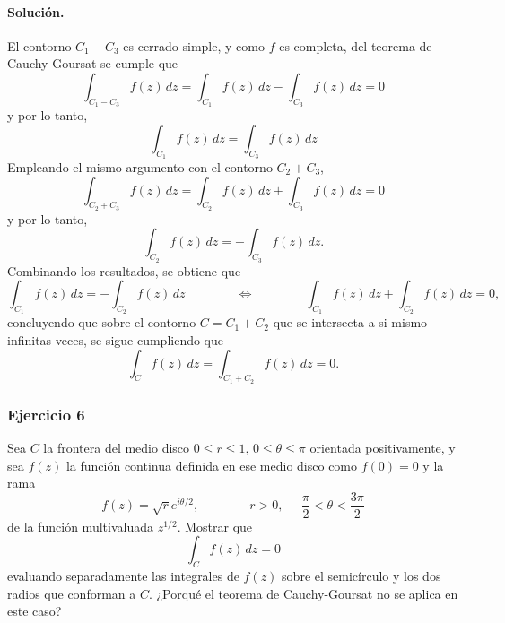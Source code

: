 \documentclass[a4paper]{report}
\begin{document}
\paragraph{Solución.} El contorno \(C_1-C_3\) es cerrado simple, y como \(f\) es completa, del teorema de Cauchy-Goursat se cumple que 
\[
 \int_{C_1-C_3}f(z)\,dz=\int_{C_1}f(z)\,dz-\int_{C_3}f(z)\,dz=0
\]
y por lo tanto,
\[
 \int_{C_1}f(z)\,dz=\int_{C_3}f(z)\,dz
\]
Empleando el mismo argumento con el contorno \(C_2+C_3\),
\[
 \int_{C_2+C_3}f(z)\,dz=\int_{C_2}f(z)\,dz+\int_{C_3}f(z)\,dz=0
\]
y por lo tanto,
\[
 \int_{C_2}f(z)\,dz=-\int_{C_3}f(z)\,dz.
\]
Combinando los resultados, se obtiene que 
\[
 \int_{C_1}f(z)\,dz=-\int_{C_2}f(z)\,dz
 \qquad\qquad\Leftrightarrow\qquad\qquad 
 \int_{C_1}f(z)\,dz+\int_{C_2}f(z)\,dz=0,
\]
concluyendo que sobre el contorno \(C=C_1+C_2\) que se intersecta a si mismo infinitas veces, se sigue cumpliendo que 
\[
 \int_{C}f(z)\,dz=\int_{C_1+C_2}f(z)\,dz=0.
\]

\subsubsection*{Ejercicio 6}

Sea \(C\) la frontera del medio disco \(0\leq r\leq 1,\, 0\leq\theta\leq\pi\) orientada positivamente, y sea \(f(z)\) la función continua definida en ese medio disco como \(f(0)=0\) y la rama
\[
 f(z)=\sqrt{r}e^{i\theta/2},
 \qquad\qquad
 r>0,\,-\frac{\pi}{2}<\theta<\frac{3\pi}{2}
\]
de la función multivaluada \(z^{1/2}\). Mostrar que 
\[
 \int_Cf(z)\,dz=0
\]
evaluando separadamente las integrales de \(f(z)\) sobre el semicírculo y los dos radios que conforman a \(C\). ¿Porqué el teorema de Cauchy-Goursat no se aplica en este caso?
\end{document}
